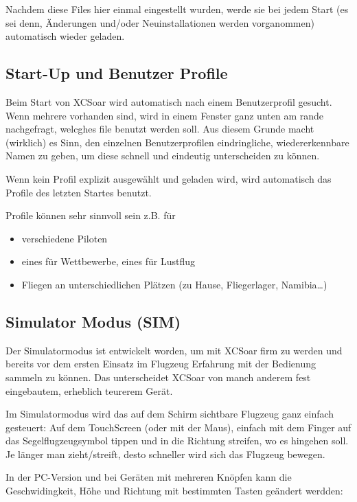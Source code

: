 Nachdem diese Files hier einmal eingestellt wurden, werde sie bei jedem Start (es sei denn, Änderungen und/oder Neuinstallationen werden vorganommen)
automatisch wieder geladen.

\subsection*{Start-Up und Benutzer Profile}
Beim Start von {\textsf  XCSoar} wird automatisch nach einem Benutzerprofil gesucht. Wenn mehrere vorhanden sind, wird in einem Fenster ganz unten am rande nachgefragt, welcghes file benutzt werden soll.
Aus diesem Grunde macht (wirklich) es Sinn, den einzelnen Benutzerprofilen eindringliche, wiedererkennbare Namen zu geben, 
um diese schnell und eindeutig unterscheiden zu können. 

Wenn kein Profil explizit ausgewählt und geladen wird, wird automatisch das Profile des letzten Startes benutzt. 

Profile können sehr sinnvoll sein z.B. für  

\begin{itemize}
\item verschiedene Piloten
\item eines für Wettbewerbe, eines für Lustflug
\item Fliegen an unterschiedlichen Plätzen (zu Hause, Fliegerlager, Namibia\dots )
\end{itemize}


\subsection*{Simulator Modus (SIM)}
Der Simulatormodus ist entwickelt worden, um mit {\textsf  XCSoar} firm zu werden und bereits vor dem ersten Einsatz im Flugzeug 
Erfahrung mit der Bedienung sammeln zu können. Das unterscheidet {\textsf  XCSoar} von manch anderem fest eingebautem, erheblich teurerem 
 Gerät. 

Im Simulatormodus wird das auf dem Schirm sichtbare Flugzeug ganz einfach gesteuert:
Auf dem TouchScreen (oder mit der Maus), einfach mit dem Finger auf das Segelflugzeugsymbol tippen und in die Richtung 
streifen, wo es hingehen soll. Je länger man zieht/streift, desto schneller wird sich das Flugzeug bewegen. 

In der PC-Version und bei Geräten mit mehreren Knöpfen kann die Geschwidingkeit, Höhe und Richtung mit bestimmten Tasten geändert werdden: 



